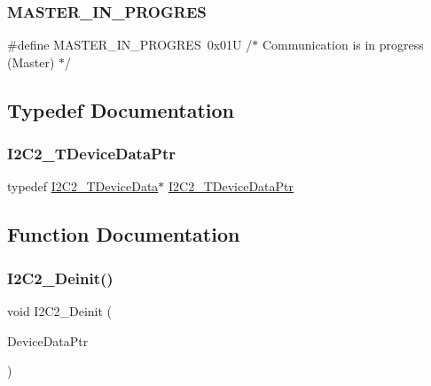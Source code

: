 \subsubsection{\texorpdfstring{M\+A\+S\+T\+E\+R\+\_\+\+I\+N\+\_\+\+P\+R\+O\+G\+R\+ES}{MASTER\_IN\_PROGRES}}
{\footnotesize\ttfamily \#define M\+A\+S\+T\+E\+R\+\_\+\+I\+N\+\_\+\+P\+R\+O\+G\+R\+ES~0x01\+U  /$\ast$ Communication is in progress (\+Master) $\ast$/}



\subsection{Typedef Documentation}
\mbox{\label{group___i2_c2__module_ga8699213d2cea6eac9e378ccb8a2b1ec7}} 
\subsubsection{\texorpdfstring{I2\+C2\+\_\+\+T\+Device\+Data\+Ptr}{I2C2\_TDeviceDataPtr}}
{\footnotesize\ttfamily typedef \hyperlink{struct_i2_c2___t_device_data}{I2\+C2\+\_\+\+T\+Device\+Data}$\ast$ \hyperlink{group___i2_c2__module_ga8699213d2cea6eac9e378ccb8a2b1ec7}{I2\+C2\+\_\+\+T\+Device\+Data\+Ptr}}



\subsection{Function Documentation}
\mbox{\label{group___i2_c2__module_gae001dbec802cf15fd903e13dad2bd54d}} 
\subsubsection{\texorpdfstring{I2\+C2\+\_\+\+Deinit()}{I2C2\_Deinit()}}
{\footnotesize\ttfamily void I2\+C2\+\_\+\+Deinit (\begin{DoxyParamCaption}\item[{\hyperlink{group___p_e___types__module_gac5cf1362f1f0e3a2ce71b1bf2276d091}{L\+D\+D\+\_\+\+T\+Device\+Data} $\ast$}]{Device\+Data\+Ptr }\end{DoxyParamCaption})}



